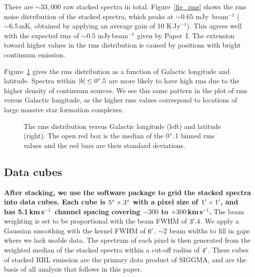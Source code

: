 \documentclass[manuscript]{aastex61}
\newcommand{\kms}{\,km\,s$^{-1}$}
\begin{document}
There are $\sim33,000$ raw stacked spectra in total.
Figure~\ref{fig_rms} shows the rms noise distribution of the stacked spectra, which peaks at $\sim0.65$ mJy\, beam$^{-1}$ ($\sim6.5$\,mK, obtained by applying an average gain of 10 K\,Jy$^{-1}$). 
This agrees well with the expected rms of $\sim0.5$ mJy\,beam$^{-1}$ given by Paper~I. 
The extension toward higher values in the rms distribution is caused by positions with bright continuum emission.

Figure~\ref{fig_rms_glat} gives the rms distribution as a function of Galactic longitude and latitude.
Spectra within $|b| \leq 0\mbox{$^\circ$}.5$ are more likely to have high rms due to the higher density of continuum sources.
We see this same pattern in the plot of rms versus Galactic longitude, as the higher rms values correspond to locations of large massive star formation complexes.

\begin{figure}[htbp]
\caption{The rms distribution versus Galactic longitude (left) and latitude (right).
The open red box is the median of the 0$\mbox{$^\circ$}$.1 binned rms values and the red bars are their standard deviations.
}\label{fig_rms_glat}
\end{figure}

\subsection{Data cubes} \label{sec_cube}
\textbf{
After stacking, we use the software package  to grid the stacked spectra into data cubes.
Each cube is $5\mbox{$^\circ$} \times 3\mbox{$^\circ$}$ with a pixel size of $1\mbox{$^\prime$} \times 1 \mbox{$^\prime$}$, and has 5.1\kms\ channel spacing covering $-300$ to $+300$\kms.}
The beam weighting is set to be proportional with the beam FWHM of $3\mbox{$^\prime$}.4$.
We apply a Gaussian smoothing with the kernel FWHM of $6\mbox{$^\prime$}$, $\sim2$ beam widths to fill in gaps where we lack usable data.
The spectrum of each pixel is then generated from the weighted median of the stacked spectra within a cut-off radius of $4\mbox{$^\prime$}$.
These cubes of stacked RRL emission are the primary data product of SIGGMA, and are the basis of all analysis that follows in this paper.
\end{document}
